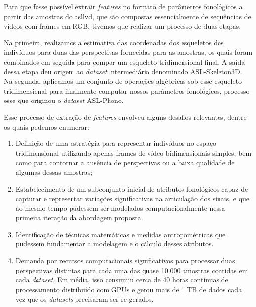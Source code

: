 Para que fosse possível extrair \textit{features} no formato de parâmetros fonológicos a partir das amostras do \acrshort{asllvd}, que são compostas essencialmente de sequências de vídeos com frames em RGB, tivemos que realizar um processo de duas etapas.

Na primeira, realizamos a estimativa das coordenadas dos esqueletos dos indivíduos para duas das perspectivas fornecidas para as amostras, os quais foram combinados em seguida para compor um esqueleto tridimensional final. A saída dessa etapa deu origem ao \textit{dataset} intermediário denominado ASL-Skeleton3D. 
Na segunda, aplicamos um conjunto de operações algébricas sob esse esqueleto tridimensional para finalmente computar nossos parâmetros fonológicos, processo esse que originou o \textit{dataset} ASL-Phono.


Esse processo de extração de \textit{features} envolveu alguns desafios relevantes, dentre os quais podemos enumerar:

\begin{enumerate}
    \item Definição de uma estratégia para representar indivíduos no espaço tridimensional utilizando apenas frames de vídeo bidimensionais simples, bem como para contornar a ausência de perspectivas ou a baixa qualidade de algumas dessas amostras;

    \item Estabelecimento de um subconjunto inicial de atributos fonológicos capaz de capturar e representar variações significativas na articulação dos sinais, e que ao mesmo tempo pudessem ser modelados computacionalmente nessa primeira iteração da abordagem proposta.

    \item Identificação de técnicas matemáticas e medidas antropométricas que pudessem fundamentar a modelagem e o cálculo desses atributos.

    \item Demanda por recursos computacionais significativos para processar duas perspectivas distintas para cada uma das quase 10.000 amostras contidas em cada \textit{dataset}. Em média, isso consumiu cerca de 40 horas contínuas de processamento distribuído com GPUs e gerou mais de 1 TB de dados cada vez que os \textit{datasets} precisaram ser re-gerados.
\end{enumerate}





